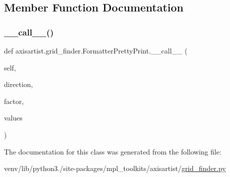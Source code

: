 \subsection{Member Function Documentation}
\mbox{\label{classaxisartist_1_1grid__finder_1_1FormatterPrettyPrint_abeb02f8e0c919122d170a76e0a1424b2}} 
\subsubsection{\texorpdfstring{\+\_\+\+\_\+call\+\_\+\+\_\+()}{\_\_call\_\_()}}
{\footnotesize\ttfamily def axisartist.\+grid\+\_\+finder.\+Formatter\+Pretty\+Print.\+\_\+\+\_\+call\+\_\+\+\_\+ (\begin{DoxyParamCaption}\item[{}]{self,  }\item[{}]{direction,  }\item[{}]{factor,  }\item[{}]{values }\end{DoxyParamCaption})}



The documentation for this class was generated from the following file\+:\begin{DoxyCompactItemize}
\item 
venv/lib/python3./site-\/packages/mpl\+\_\+toolkits/axisartist/\hyperlink{axisartist_2grid__finder_8py}{grid\+\_\+finder.\+py}\end{DoxyCompactItemize}
